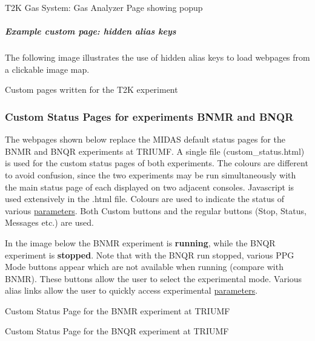 \begin{center} T2K Gas System: Gas Analyzer Page showing popup\par
  \end{center} 

\par
 \par
 \hypertarget{RC_T2K_Gas_Page_T2K_example_2}{}\subparagraph{Example custom page: hidden alias keys}\label{RC_T2K_Gas_Page_T2K_example_2}
The following image illustrates the use of hidden alias keys to load webpages from a clickable image map.

\begin{center} Custom pages written for the T2K experiment  \end{center}  \par
 

\par
 \label{index_end}
\hypertarget{index_end}{}
 \subsubsection{Custom Status Pages for experiments BNMR and BNQR}\label{RC_BNMQR_status}
\par
 

The webpages shown below replace the MIDAS default status pages for the BNMR and BNQR experiments at TRIUMF. A single file (custom\_\-status.html) is used for the custom status pages of both experiments. The colours are different to avoid confusion, since the two experiments may be run simultaneously with the main status page of each displayed on two adjacent consoles. Javascript is used extensively in the .html file. Colours are used to indicate the status of various \hyperlink{structparameters}{parameters}. Both Custom buttons and the regular buttons (Stop, Status, Messages etc.) are used.

In the image below the BNMR experiment is {\bfseries running}, while the BNQR experiment is {\bfseries stopped}. Note that with the BNQR run stopped, various PPG Mode buttons appear which are not available when running (compare with BNMR). These buttons allow the user to select the experimental mode. Various alias links allow the user to quickly access experimental \hyperlink{structparameters}{parameters}.

\begin{center} Custom Status Page for the BNMR experiment at TRIUMF  \par
\par
 Custom Status Page for the BNQR experiment at TRIUMF  \end{center} 

